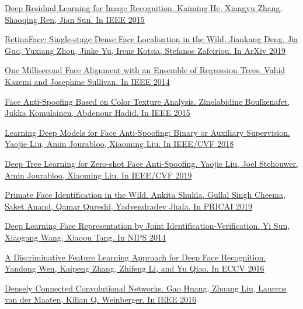 \begin{thebibliography}{0}
    \hypertarget{resnet}{}
    \href{https://arxiv.org/abs/1512.03385}
    {Deep Residual Learning for Image Recognition.
    Kaiming He, Xiangyu Zhang, Shaoqing Ren, Jian Sun.
    In IEEE 2015}

    \hypertarget{retinaface}{}
    \href{https://arxiv.org/abs/1905.00641}
    {RetinaFace: Single-stage Dense Face Localisation in the Wild.
    Jiankang Deng, Jia Guo, Yuxiang Zhou, Jinke Yu, Irene Kotsia, Stefanos Zafeiriou.
    In ArXiv 2019
    }

    \hypertarget{align}{}
    \href{http://www.csc.kth.se/~vahidk/papers/KazemiCVPR14.pdf}
    {One Millisecond Face Alignment with an Ensemble of Regression Trees.
    Vahid Kazemi and Josephine Sullivan.
    In IEEE 2014}

    \hypertarget{lpb}{}
    \href{https://arxiv.org/abs/1511.06316}
    {Face Anti-Spoofing Based on Color Texture Analysis.
    Zinelabidine Boulkenafet, Jukka Komulainen, Abdenour Hadid.
    In IEEE 2015}

    \hypertarget{lpb2}{}
    \href{https://arxiv.org/abs/1803.11097}
    {Learning Deep Models for Face Anti-Spoofing: Binary or Auxiliary Supervision.
    Yaojie Liu, Amin Jourabloo, Xiaoming Liu.
    In IEEE/CVF 2018}

    \hypertarget{lpb3}{}
    \href{https://arxiv.org/abs/1904.02860}
    {Deep Tree Learning for Zero-shot Face Anti-Spoofing.
    Yaojie Liu, Joel Stehouwer, Amin Jourabloo, Xiaoming Liu.
    In IEEE/CVF 2019}

    \hypertarget{pfid}{}
    \href{https://arxiv.org/abs/1907.02642}
    {Primate Face Identification in the Wild.
    Ankita Shukla, Gullal Singh Cheema, Saket Anand, Qamar Qureshi, Yadvendradev Jhala.
    In PRICAI 2019}

    \hypertarget{pfid2}{}
    \href{https://arxiv.org/abs/1406.4773}
    {Deep Learning Face Representation by Joint Identification-Verification.
    Yi Sun, Xiaogang Wang, Xiaoou Tang.
    In NIPS 2014}

    \hypertarget{pfid3}{}
    \href{https://ydwen.github.io/papers/WenECCV16.pdf}
    {A Discriminative Feature Learning Approach for Deep Face Recognition.
    Yandong Wen, Kaipeng Zhang, Zhifeng Li, and Yu Qiao.
    In ECCV 2016}

    \hypertarget{densenet}{}
    \href{https://arxiv.org/abs/1608.06993}
    {Densely Connected Convolutional Networks.
    Gao Huang, Zhuang Liu, Laurens van der Maaten, Kilian Q. Weinberger.
    In IEEE 2016}


\end{thebibliography}
